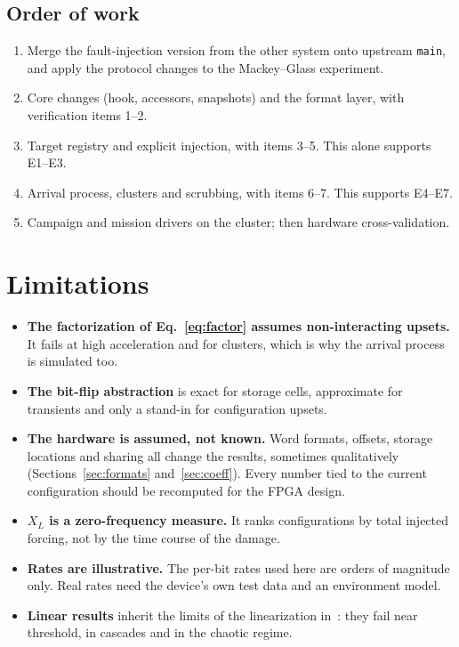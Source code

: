 \documentclass[11pt,a4paper]{article}
\begin{document}
\subsection{Order of work}

\begin{enumerate}
  \item Merge the fault-injection version from the other system onto upstream \texttt{main}, and apply the protocol changes to the Mackey--Glass experiment.
  \item Core changes (hook, accessors, snapshots) and the format layer, with verification items 1--2.
  \item Target registry and explicit injection, with items 3--5. This alone supports E1--E3.
  \item Arrival process, clusters and scrubbing, with items 6--7. This supports E4--E7.
  \item Campaign and mission drivers on the cluster; then hardware cross-validation.
\end{enumerate}

\section{Limitations}

\begin{itemize}
  \item \textbf{The factorization of Eq.~\eqref{eq:factor} assumes non-interacting upsets.} It fails at high acceleration and for clusters, which is why the arrival process is simulated too.
  \item \textbf{The bit-flip abstraction} is exact for storage cells, approximate for transients and only a stand-in for configuration upsets.
  \item \textbf{The hardware is assumed, not known.} Word formats, offsets, storage locations and sharing all change the results, sometimes qualitatively (Sections~\ref{sec:formats} and~\ref{sec:coeff}). Every number tied to the current configuration should be recomputed for the FPGA design.
  \item \textbf{$X_L$ is a zero-frequency measure.} It ranks configurations by total injected forcing, not by the time course of the damage.
  \item \textbf{Rates are illustrative.} The per-bit rates used here are orders of magnitude only. Real rates need the device's own test data and an environment model.
  \item \textbf{Linear results} inherit the limits of the linearization in~\cite{dropout2026}: they fail near threshold, in cascades and in the chaotic regime.
\end{itemize}
\end{document}
